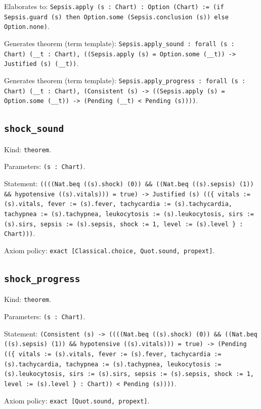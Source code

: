 \documentclass[11pt]{article}
\begin{document}
\noindent Elaborates to: \texttt{Sepsis.apply (s : Chart) : Option (Chart) := (if Sepsis.guard (s) then Option.some (Sepsis.conclusion (s)) else Option.none)}.\par
\noindent Generates theorem (term template): \texttt{Sepsis.apply\_sound : forall (s : Chart) (\_\_t : Chart), ((Sepsis.apply (s) = Option.some (\_\_t)) -> Justified (s) (\_\_t))}.\par
\noindent Generates theorem (term template): \texttt{Sepsis.apply\_progress : forall (s : Chart) (\_\_t : Chart), (Consistent (s) -> ((Sepsis.apply (s) = Option.some (\_\_t)) -> (Pending (\_\_t) < Pending (s))))}.\par
\subsection*{\texttt{shock\_sound}}
\noindent Kind: \texttt{theorem}.\par
\noindent Parameters: \texttt{(s : Chart)}.\par
\noindent Statement: \texttt{((((Nat.beq ((s).shock) (0)) \&\& ((Nat.beq ((s).sepsis) (1)) \&\& hypotensive ((s).vitals))) = true) -> Justified (s) ((\{ vitals := (s).vitals, fever := (s).fever, tachycardia := (s).tachycardia, tachypnea := (s).tachypnea, leukocytosis := (s).leukocytosis, sirs := (s).sirs, sepsis := (s).sepsis, shock := 1, level := (s).level \} : Chart)))}.\par
\noindent Axiom policy: \texttt{exact [Classical.choice, Quot.sound, propext]}.\par
\subsection*{\texttt{shock\_progress}}
\noindent Kind: \texttt{theorem}.\par
\noindent Parameters: \texttt{(s : Chart)}.\par
\noindent Statement: \texttt{(Consistent (s) -> ((((Nat.beq ((s).shock) (0)) \&\& ((Nat.beq ((s).sepsis) (1)) \&\& hypotensive ((s).vitals))) = true) -> (Pending ((\{ vitals := (s).vitals, fever := (s).fever, tachycardia := (s).tachycardia, tachypnea := (s).tachypnea, leukocytosis := (s).leukocytosis, sirs := (s).sirs, sepsis := (s).sepsis, shock := 1, level := (s).level \} : Chart)) < Pending (s))))}.\par
\noindent Axiom policy: \texttt{exact [Quot.sound, propext]}.\par
\end{document}
